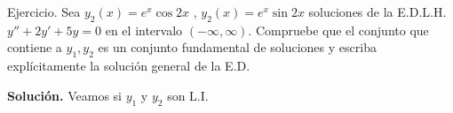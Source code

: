 \documentclass{beamer}
\begin{document}
\begin{frame}[t]
	\begin{alertblock}{Ejercicio.}
		Sea \(y_2(x) = e^x \cos 2x\) , \(y_2(x) = e^x \sin 2x\) soluciones de la E.D.L.H. \(y'' +2y' +5y=0\) en el intervalo \((- \infty , \infty)\). Compruebe que el conjunto que contiene a \(y_1,y_2\) es un conjunto fundamental de soluciones y escriba explícitamente la solución general de la E.D.
	\end{alertblock}
	\begin{alertblock}{}
		\textbf{Solución.} Veamos si \(y_1\) y \(y_2\) son L.I. 
		
	\end{alertblock}
\end{frame}
\end{document}
